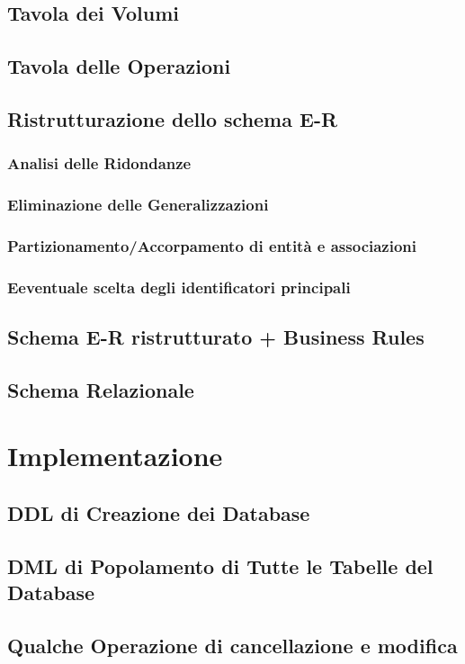 \documentclass[letterpaper]{report}
\begin{document}
\section{Tavola dei Volumi}
\section{Tavola delle Operazioni}
\section{Ristrutturazione dello schema E-R}
\subsection{Analisi delle Ridondanze}
\subsection{Eliminazione delle Generalizzazioni}
\subsection{Partizionamento/Accorpamento di entità e associazioni}
\subsection{Eeventuale scelta degli identificatori principali}
\section{Schema E-R ristrutturato + Business Rules}
\section{Schema Relazionale}

\chapter{Implementazione}
\section{DDL di Creazione dei Database}
\section{DML di Popolamento di Tutte le Tabelle del Database}
\section{Qualche Operazione di cancellazione e modifica}
\end{document}
